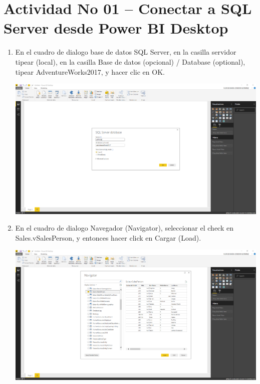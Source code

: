 \section{Actividad No 01 – Conectar a SQL Server desde Power BI Desktop} 



\begin{enumerate}[1.]
	\item  En el cuadro de dialogo base de datos SQL Server, en la casilla servidor tipear (local), en la casilla Base de datos (opcional) / Database (optional), tipear AdventureWorks2017, y hacer clic en OK.
	

	\begin{center}
	\includegraphics[width=16cm]{./Imagenes/11} 
	\end{center}


	\item  En el cuadro de dialogo Navegador (Navigator), seleccionar el check en Sales.vSalesPerson, y entonces hacer click en Cargar (Load).

	\begin{center}
	\includegraphics[width=16cm]{./Imagenes/12} 
	\end{center}



\end{enumerate}
